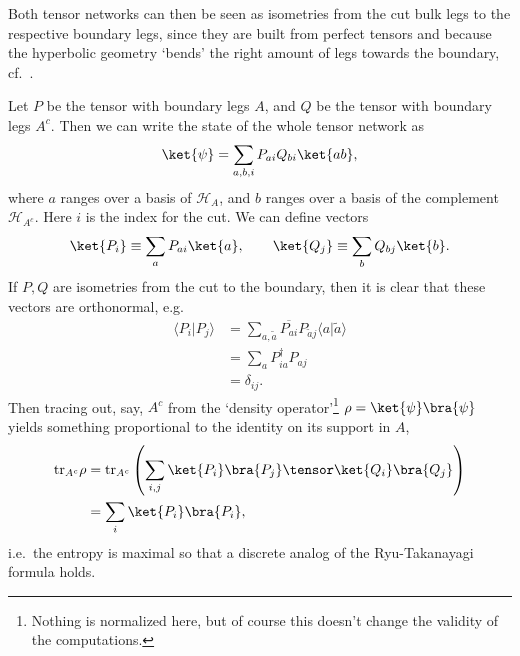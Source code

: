 Both tensor networks can then be seen as isometries from the cut bulk legs to the respective boundary legs, since they are built from perfect tensors and because the hyperbolic geometry `bends' the right amount of legs towards the boundary, cf.\ \cite[Theorem 2]{Pastawski2015Holographic}.

Let $P$ be the tensor with boundary legs $A$, and $Q$ be the tensor with boundary legs $A^c$. Then we can write the state of the whole tensor network as
\begin{align*}
\ket{\psi} = \sum_{a,b,i} P_{ai}Q_{bi}\ket{ab},
\end{align*}
where $a$ ranges over a basis of $\mathcal{H}_A$, and $b$ ranges over a basis of the complement $\mathcal{H}_{A^c}$. Here $i$ is the index for the cut. We can define vectors 
\begin{align*}
\ket{P_i} \equiv \sum_a P_{ai}\ket{a},\qquad \ket{Q_j} \equiv \sum_b Q_{bj}\ket{b}.
\end{align*}
If $P,Q$ are isometries from the cut to the boundary, then it is clear that these vectors are orthonormal, e.g.
\begin{align*}
\langle{P_i | P_j }\rangle &= \sum_{a,\tilde{a}} \overline{P_{ai}} P_{\tilde{a}j} \langle a|\tilde{a} \rangle \\
&= \sum_{a} P^\dagger_{ia} P_{aj} \\
&= \delta_{ij}.
\end{align*}
Then tracing out, say,  $A^c$ from the `density operator'\footnote{Nothing is normalized here, but of course this doesn't change the validity of the computations.} $\rho = \ket{\psi}\bra{\psi}$ yields something proportional to the identity on its support in $A$,
\begin{align*}
\mathrm{tr}_{A^c} \rho &= 
\mathrm{tr}_{A^c} \left( \sum_{i,j} \ket{P_i}\bra{P_j}\tensor\ket{Q_i}\bra{Q_j} \right) \\ 
&= \sum_i  \ket{P_i}\bra{P_i},
\end{align*}
i.e.\ the entropy is maximal so that a discrete analog of the Ryu-Takanayagi formula holds.



